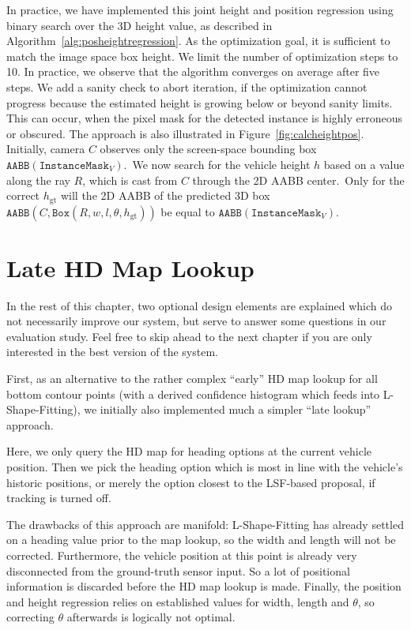 In practice, we have implemented this joint height and position regression using binary search over the 3D height value, as described in Algorithm~\ref{alg:posheightregression}.
As the optimization goal, it is sufficient to match the image space box height.
We limit the number of optimization steps to 10.
In practice, we observe that the algorithm converges on average after five steps.
We add a sanity check to abort iteration, if the optimization cannot progress because the estimated height is growing below or beyond sanity limits.
This can occur, when the pixel mask for the detected instance is highly erroneous or obscured.
The approach is also illustrated in Figure~\ref{fig:calcheightpos}. Initially, camera $C$ observes only the screen-space bounding box $\mathtt{AABB}(\texttt{InstanceMask}_V)$.\ We now search for the vehicle height $h$ based on a value along the ray $R$, which is cast from $C$ through the 2D AABB center.\ Only for the correct $h_\text{gt}$ will the 2D AABB of the predicted 3D box $\mathtt{AABB}(C,\mathtt{Box}(R,w,l,\theta,h_\text{gt}))$ be equal to $\mathtt{AABB}(\texttt{InstanceMask}_V)$.


\section{Late HD Map Lookup}
\label{sec:hdmaplate}

In the rest of this chapter, two optional design elements are explained which do not necessarily improve our system, but serve to answer some questions in our evaluation study.
Feel free to skip ahead to the next chapter if you are only interested in the best version of the system.

First, as an alternative to the rather complex \enquote{early} HD map lookup for all bottom contour points (with a derived confidence histogram which feeds into L-Shape-Fitting), we initially also implemented much a simpler \enquote{late lookup} approach.

Here, we only query the HD map for heading options at the current vehicle position.
Then we pick the heading option which is most in line with the vehicle's historic positions, or merely the option closest to the LSF-based proposal, if tracking is turned off.

The drawbacks of this approach are manifold: L-Shape-Fitting has already settled on a heading value prior to the map lookup, so the width and length will not be corrected.
Furthermore, the vehicle position at this point is already very disconnected from the ground-truth sensor input.
So a lot of positional information is discarded before the HD map lookup is made.
Finally, the position and height regression relies on established values for width, length and $\theta$, so correcting $\theta$ afterwards is logically not optimal.


